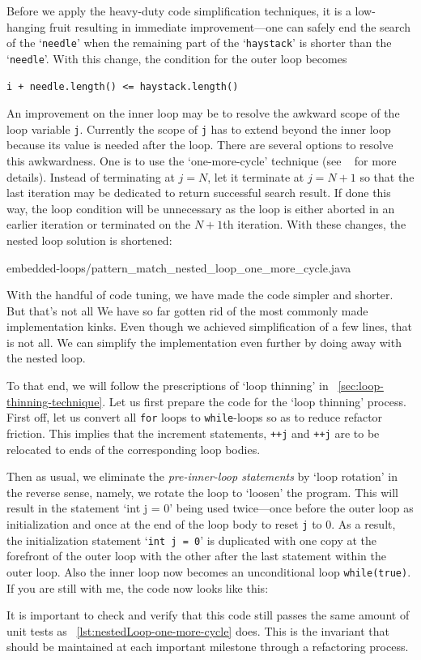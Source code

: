 \documentclass[oneside,11pt]{book}
\theoremstyle{definition}
\theoremstyle{remark}
\newcommand{\code}[1]{\mbox{\lstinline{#1}}}
\begin{document}
Before we apply the heavy-duty code simplification techniques,
it is a low-hanging fruit resulting in immediate improvement---one can safely end the search of the
`\code{needle}' when the remaining part of the `\code{haystack}' is shorter than the `\code{needle}'.
With this change, the condition for the outer loop becomes
\begin{lstlisting}
i + needle.length() <= haystack.length()
\end{lstlisting}



An improvement on the inner loop may be to resolve the awkward scope of the loop variable
\code{j}.
Currently the scope of \code{j} has to extend beyond the inner loop because
its value is needed after the loop.
There are several options to resolve this awkwardness.
One is to use the `one-more-cycle' technique (see ~\pageref{sec:one-more-cycle} for more details).
Instead of terminating at $j = N$, let it terminate at $j = N+1$ so that the last
iteration may be dedicated to return successful search result.
If done this way, the loop condition will be unnecessary as the loop is
either aborted in an earlier iteration or terminated on the $N+1$th iteration.
With these changes, the nested loop solution is shortened:

{embedded-loops/pattern_match_nested_loop_one_more_cycle.java}


With the handful of code tuning, we have made the code simpler and shorter.
But that's not all
We have so far gotten rid of the most commonly made implementation kinks.
Even though we achieved simplification of a few lines, that is not all.
We can simplify the implementation even further by doing away with the nested loop.


To that end, we will follow the prescriptions of `loop thinning' in
~\autoref{sec:loop-thinning-technique}.
Let us first prepare the code for the `loop thinning' process.
First off, let us convert all \code{for} loops to \code{while}-loops so as to reduce refactor
friction.
This implies that the increment statements, \code{++j} and \code{++j} are to be relocated to ends
of the corresponding loop bodies.


Then as usual, we eliminate the \emph{pre-inner-loop statements} by `loop rotation' in the
reverse sense, namely, we rotate the loop to `loosen' the program.
This will result in the statement `int j = 0' being used twice---once before the outer loop as
initialization and once at the end of the loop body to reset \code{j} to 0.
As a result, the initialization statement `\code{int j = 0}' is duplicated with one copy
at the forefront of the outer loop with the other after the last statement within the outer loop.
Also the inner loop now becomes an unconditional loop \code{while(true)}.
If you are still with me, the code now looks like this:

It is important to check and verify that this code still passes the same amount of
unit tests as ~\autoref{lst:nestedLoop-one-more-cycle} does.
This is the invariant that should be maintained at each important milestone
through a refactoring process.
\end{document}
